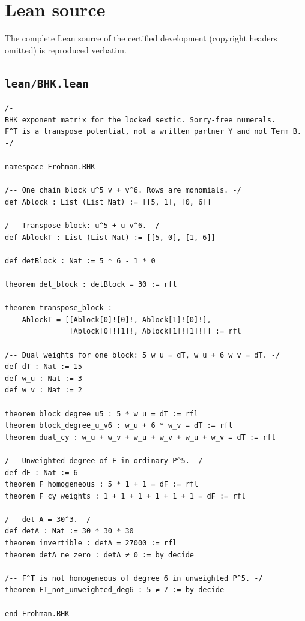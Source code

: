 \documentclass[11pt]{amsart}
\theoremstyle{definition}
\theoremstyle{remark}
\begin{document}
\appendix
\section{Lean source}
The complete Lean source of the certified development (copyright headers omitted) is reproduced verbatim.
\subsection*{\texttt{lean/BHK.lean}}
\begin{verbatim}
/-
BHK exponent matrix for the locked sextic. Sorry-free numerals.
F^T is a transpose potential, not a written partner Y and not Term B.
-/

namespace Frohman.BHK

/-- One chain block u^5 v + v^6. Rows are monomials. -/
def Ablock : List (List Nat) := [[5, 1], [0, 6]]

/-- Transpose block: u^5 + u v^6. -/
def AblockT : List (List Nat) := [[5, 0], [1, 6]]

def detBlock : Nat := 5 * 6 - 1 * 0

theorem det_block : detBlock = 30 := rfl

theorem transpose_block :
    AblockT = [[Ablock[0]![0]!, Ablock[1]![0]!],
               [Ablock[0]![1]!, Ablock[1]![1]!]] := rfl

/-- Dual weights for one block: 5 w_u = dT, w_u + 6 w_v = dT. -/
def dT : Nat := 15
def w_u : Nat := 3
def w_v : Nat := 2

theorem block_degree_u5 : 5 * w_u = dT := rfl
theorem block_degree_u_v6 : w_u + 6 * w_v = dT := rfl
theorem dual_cy : w_u + w_v + w_u + w_v + w_u + w_v = dT := rfl

/-- Unweighted degree of F in ordinary P^5. -/
def dF : Nat := 6
theorem F_homogeneous : 5 * 1 + 1 = dF := rfl
theorem F_cy_weights : 1 + 1 + 1 + 1 + 1 + 1 = dF := rfl

/-- det A = 30^3. -/
def detA : Nat := 30 * 30 * 30
theorem invertible : detA = 27000 := rfl
theorem detA_ne_zero : detA ≠ 0 := by decide

/-- F^T is not homogeneous of degree 6 in unweighted P^5. -/
theorem FT_not_unweighted_deg6 : 5 ≠ 7 := by decide

end Frohman.BHK
\end{verbatim}
\end{document}
